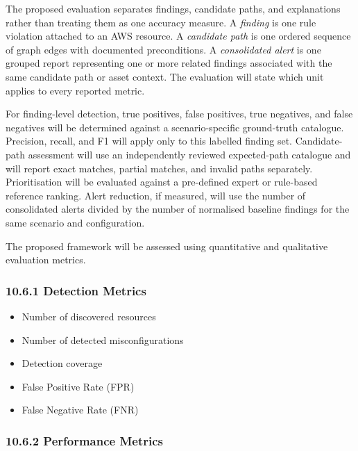 The proposed evaluation separates findings, candidate paths, and explanations rather than treating them as one accuracy measure. A \emph{finding} is one rule violation attached to an AWS resource. A \emph{candidate path} is one ordered sequence of graph edges with documented preconditions. A \emph{consolidated alert} is one grouped report representing one or more related findings associated with the same candidate path or asset context. The evaluation will state which unit applies to every reported metric.

For finding-level detection, true positives, false positives, true negatives, and false negatives will be determined against a scenario-specific ground-truth catalogue. Precision, recall, and F1 will apply only to this labelled finding set. Candidate-path assessment will use an independently reviewed expected-path catalogue and will report exact matches, partial matches, and invalid paths separately. Prioritisation will be evaluated against a pre-defined expert or rule-based reference ranking. Alert reduction, if measured, will use the number of consolidated alerts divided by the number of normalised baseline findings for the same scenario and configuration.

The proposed framework will be assessed using quantitative and qualitative evaluation metrics.

\subsubsection{10.6.1 Detection Metrics}

\begin{itemize}
\tightlist
\item
  Number of discovered resources\\
\item
  Number of detected misconfigurations\\
\item
  Detection coverage\\
\item
  False Positive Rate (FPR)\\
\item
  False Negative Rate (FNR)
\end{itemize}

\subsubsection{10.6.2 Performance Metrics}

